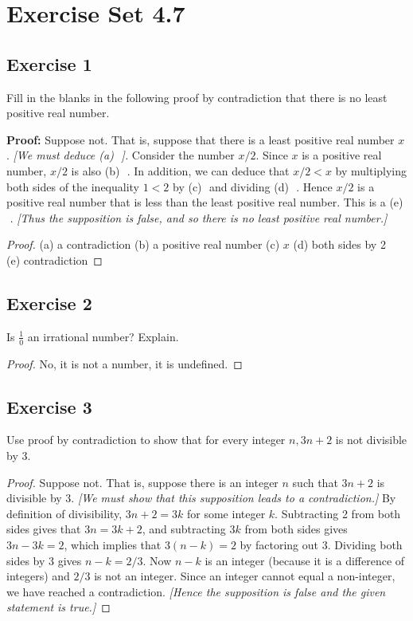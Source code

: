 \documentclass[14pt]{extarticle}
\newcommand{\fbl}{\underline{\hspace{1cm}}\,\,}
\newcommand{\cy}{\color{cyan}}
\begin{document}
\section{Exercise Set 4.7}
\subsection{Exercise 1}
Fill in the blanks in the following proof by contradiction that there is no least positive real number.

    {\bf Proof:} Suppose not. That is, suppose that there is a least positive real number $x$. {\it[We must deduce {\cy (a)} \fbl].} Consider the number $x/2$. Since $x$ is a positive real number, $x/2$ is also {\cy (b)} \fbl. In addition, we can deduce that $x/2 < x$ by multiplying both sides of the inequality $1 < 2$ by {\cy (c)} \fbl and dividing {\cy (d)} \fbl. Hence $x/2$ is a positive real number that is less than the least positive real number. This is a {\cy (e)} \fbl. {\it[Thus the supposition is false, and so there is no least positive real number.]}

\begin{proof}
    (a) a contradiction
    (b) a positive real number
    (c) $x$
    (d) both sides by 2 \\
    (e) contradiction
\end{proof}

\subsection{Exercise 2}
Is $\frac{1}{0}$ an irrational number? Explain.

\begin{proof}
    No, it is not a number, it is undefined.
\end{proof}

\subsection{Exercise 3}
Use proof by contradiction to show that for every integer $n, 3n + 2$ is not divisible by 3.

\begin{proof}
    Suppose not. That is, suppose there is an integer $n$ such that $3n + 2$ is divisible by 3. {\it [We must show that this supposition leads to a contradiction.]} By definition of divisibility, $3n + 2 = 3k$ for some integer $k$. Subtracting 2 from both sides gives that $3n = 3k + 2$, and subtracting $3k$ from both sides gives $3n - 3k = 2$, which implies that $3(n - k) = 2$ by factoring out 3. Dividing both sides by 3 gives $n - k = 2/3$. Now $n - k$ is an integer (because it is a difference of integers) and $2/3$ is not an integer. Since an integer cannot equal a non-integer, we have reached a contradiction. {\it[Hence the supposition is false and the given statement is true.]}
\end{proof}
\end{document}
